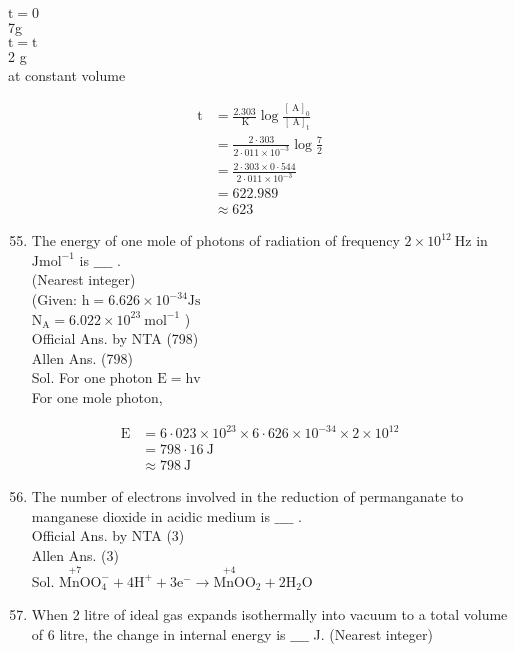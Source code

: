 \documentclass[10pt]{article}
\begin{document}
\(\mathrm{t}=0\)\\
7g\\
\(\mathrm{t}=\mathrm{t}\)\\
2 g\\
at constant volume

\[
\begin{aligned}
\mathrm{t} & =\frac{2.303}{\mathrm{~K}} \log \frac{[\mathrm{~A}]_{0}}{[\mathrm{~A}]_{\mathrm{t}}} \\
& =\frac{2 \cdot 303}{2 \cdot 011 \times 10^{-3}} \log \frac{7}{2} \\
& =\frac{2 \cdot 303 \times 0 \cdot 544}{2 \cdot 011 \times 10^{-3}} \\
& =622.989 \\
& \approx 623
\end{aligned}
\]

\begin{enumerate}
  \setcounter{enumi}{54}
  \item The energy of one mole of photons of radiation of frequency \(2 \times 10^{12} \mathrm{~Hz}\) in \(\mathrm{J} \mathrm{mol}^{-1}\) is \(\_\_\_\_\) .\\
(Nearest integer)\\
(Given: \(\mathrm{h}=6.626 \times 10^{-34} \mathrm{Js}\)\\
\(\mathrm{N}_{\mathrm{A}}=6.022 \times 10^{23} \mathrm{~mol}^{-1}\) )\\
Official Ans. by NTA (798)\\
Allen Ans. (798)\\
Sol. For one photon \(\mathrm{E}=\mathrm{hv}\)\\
For one mole photon,
\end{enumerate}

\[
\begin{aligned}
\mathrm{E} & =6 \cdot 023 \times 10^{23} \times 6 \cdot 626 \times 10^{-34} \times 2 \times 10^{12} \\
& =798 \cdot 16 \mathrm{~J} \\
& \approx 798 \mathrm{~J}
\end{aligned}
\]

\begin{enumerate}
  \setcounter{enumi}{55}
  \item The number of electrons involved in the reduction of permanganate to manganese dioxide in acidic medium is \(\_\_\_\_\) .\\
Official Ans. by NTA (3)\\
Allen Ans. (3)\\
Sol. \(\stackrel{+7}{\mathrm{MnO}} \mathrm{O}_{4}^{-}+4 \mathrm{H}^{+}+3 \mathrm{e}^{-} \longrightarrow \stackrel{+4}{\mathrm{MnO}} \mathrm{O}_{2}+2 \mathrm{H}_{2} \mathrm{O}\)
  \item When 2 litre of ideal gas expands isothermally into vacuum to a total volume of 6 litre, the change in internal energy is \(\_\_\_\_\) J. (Nearest integer)
\end{enumerate}
\end{document}
